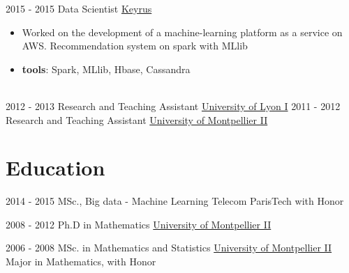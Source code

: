 \documentclass[letterpaper]{twentysecondcv} %
\begin{document}
\begin{twenty}
     \twentyitem
   		{2015 - 2015}
		{}
        {Data Scientist}
        {\href{http://www.keyrus.com/}{Keyrus}}
        {}
        {
        \begin{itemize}
        \item Worked on the development of a machine-learning platform as a service on AWS. Recommendation system on spark with MLlib
				\item \textbf{tools}: Spark, MLlib, Hbase, Cassandra
    \end{itemize} }\\
		
	\twentyitem
   		{2012 - 2013}
		{}
        {Research and Teaching Assistant}
        {\href{http://www.univ-lyon1.fr/}{University of Lyon I}}
        {}
        {}
	\twentyitem
   		{2011 - 2012}
		{}
        {Research and Teaching Assistant}
        {\href{http://www.umontpellier.fr/}{University of Montpellier II}}
        {}
        {}
        
\end{twenty}





\section{Education}{\faGraduationCap}

\begin{twenty} %
	\twentyitemshorttest
    	{2014 - 2015}
        {}
        {MSc., Big data - Machine Learning}
        {Telecom ParisTech}
        {with Honor}
				
	\twentyitemshorttest
    	{2008 - 2012}
		{}
        {Ph.D in Mathematics}
        {\href{http://www.umontpellier.fr/}{University of Montpellier II}}
        {}
				
	\twentyitemshorttest
    	{2006 - 2008}
		{}
        {MSc. in Mathematics and Statistics}
        {\href{http://www.umontpellier.fr/}{University of Montpellier II}}
        {Major in Mathematics, with Honor}
\end{twenty}
\end{document}
